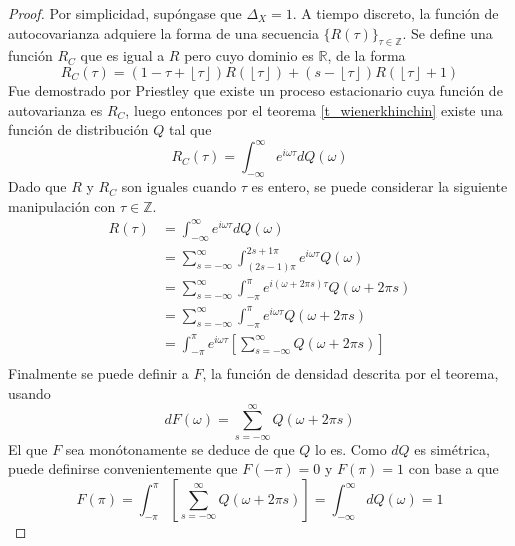 \documentclass[12pt,letterpaper]{book}
\newcommand{\R}{\mathbb{R}}
\newcommand{\Z}{\mathbb{Z}}
\newcommand{\intR}{\int_{-\infty}^{\infty}}
\newcommand{\intPI}{\int_{-\pi}^{\pi}}
\newcommand{\entero}[1]{\left\lfloor #1 \right\rfloor}
\begin{document}
\begin{proof}
Por simplicidad, supóngase que $\Delta_X=1$. A tiempo discreto, la función de autocovarianza adquiere la forma de una secuencia $\{R(\tau)\}_{\tau\in \Z}$. Se define una función $R_C$ que es igual a $R$ pero cuyo dominio es $\R$, de la forma
\begin{equation}
R_C(\tau) = \left( 1 - \tau + \entero{\tau} \right) R\left( \entero{\tau} \right) +
\left( s - \entero{\tau} \right) R\left( \entero{\tau} +1 \right)
\end{equation}
Fue demostrado por Priestley \cite{Priestley81} que existe un proceso estacionario cuya función de autovarianza es $R_C$, luego entonces por el teorema \ref{t_wienerkhinchin} existe una función de distribución $Q$ tal que 
\begin{equation}
R_C(\tau) = \intR e^{i \omega \tau} dQ(\omega)
\end{equation}
Dado que $R$ y $R_C$ son iguales cuando $\tau$ es entero, se puede considerar la siguiente manipulación con $\tau \in \Z$.
\begin{align*}
R(\tau) &= 
\intR e^{i \omega \tau} dQ(\omega) \\
&=
\sum_{s = -\infty}^{\infty} \int_{(2s-1)\pi}^{2s+1 \pi} e^{i \omega \tau} Q(\omega) \\
&=
\sum_{s = -\infty}^{\infty} \int_{-\pi}^{\pi} e^{i \left(\omega + 2\pi s \right) \tau} Q(\omega + 2 \pi s) \\
&=
\sum_{s = -\infty}^{\infty} \int_{-\pi}^{\pi} e^{i \omega \tau} Q(\omega + 2 \pi s) \\
&=
\int_{-\pi}^{\pi} e^{i \omega \tau} \left[ \sum_{s = -\infty}^{\infty} Q(\omega + 2 \pi s) \right] \\
\end{align*}
Finalmente se puede definir a $F$, la función de densidad descrita por el teorema, usando
\begin{equation}
dF(\omega) = \sum_{s = -\infty}^{\infty} Q(\omega + 2 \pi s)
\end{equation}
El que $F$ sea monótonamente se deduce de que $Q$ lo es. Como $dQ$ es simétrica, puede definirse convenientemente que $F(-\pi)=0$ y $F(\pi) = 1$ con base a que
\begin{equation}
F(\pi) = \intPI \left[ \sum_{s = -\infty}^{\infty} Q(\omega + 2 \pi s) \right] = \intR dQ(\omega) = 1
\end{equation}
\end{proof}

\end{document}
